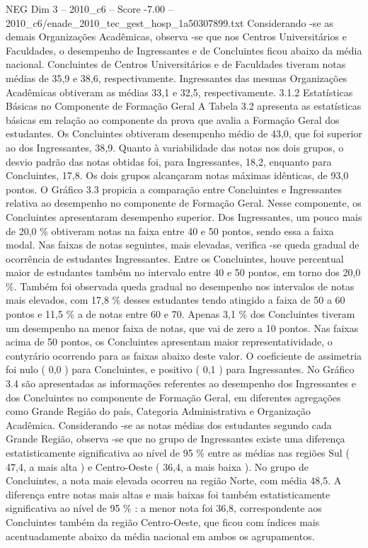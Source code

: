 \begin{textsample}{NEG Dim 3 – 2010\_c6 – Score -7.00 – 2010\_c6/enade\_2010\_tec\_gest\_hosp\_1a50307899.txt}
Considerando -se as demais Organizações Acadêmicas, observa -se que nos Centros Universitários e Faculdades, o desempenho de Ingressantes e de Concluintes ficou abaixo da média nacional.
Concluintes de Centros Universitários e de Faculdades tiveram notas médias de 35,9 e 38,6, respectivamente.
Ingressantes das mesmas Organizações Acadêmicas obtiveram as médias 33,1 e 32,5, respectivamente. 3.1.2 Estatísticas Básicas no Componente de Formação Geral A Tabela 3.2 apresenta as estatísticas básicas em relação ao componente da prova que avalia a Formação Geral dos estudantes.
Os Concluintes obtiveram desempenho médio de 43,0, que foi superior ao dos Ingressantes, 38,9.
Quanto à variabilidade das notas nos dois grupos, o desvio padrão das notas obtidas foi, para Ingressantes, 18,2, enquanto para Concluintes, 17,8.
Os dois grupos alcançaram notas máximas idênticas, de 93,0 pontos.
O Gráfico 3.3 propicia a comparação entre Concluintes e Ingressantes relativa ao desempenho no componente de Formação Geral.
Nesse componente, os Concluintes apresentaram desempenho superior.
Dos Ingressantes, um pouco mais de 20,0 \% obtiveram notas na faixa entre 40 e 50 pontos, sendo essa a faixa modal.
Nas faixas de notas seguintes, mais elevadas, verifica -se queda gradual de ocorrência de estudantes Ingressantes.
Entre os Concluintes, houve percentual maior de estudantes também no intervalo entre 40 e 50 pontos, em torno dos 20,0 \%.
Também foi observada queda gradual no desempenho nos intervalos de notas mais elevados, com 17,8 \% desses estudantes tendo atingido a faixa de 50 a 60 pontos e 11,5 \% a de notas entre 60 e 70.
Apenas 3,1 \% dos Concluintes tiveram um desempenho na menor faixa de notas, que vai de zero a 10 pontos.
Nas faixas acima de 50 pontos, os Concluintes apresentam maior representatividade, o contyrário ocorrendo para as faixas abaixo deste valor.
O coeficiente de assimetria foi nulo ( 0,0 ) para Concluintes, e positivo ( 0,1 ) para Ingressantes.
No Gráfico 3.4 são apresentadas as informações referentes ao desempenho dos Ingressantes e dos Concluintes no componente de Formação Geral, em diferentes agregações como Grande Região do país, Categoria Administrativa e Organização Acadêmica.
Considerando -se as notas médias dos estudantes segundo cada Grande Região, observa -se que no grupo de Ingressantes existe uma diferença estatisticamente significativa ao nível de 95 \% entre as médias nas regiões Sul ( 47,4, a mais alta ) e Centro-Oeste ( 36,4, a mais baixa ).
No grupo de Concluintes, a nota mais elevada ocorreu na região Norte, com média 48,5.
A diferença entre notas mais altas e mais baixas foi também estatisticamente significativa ao nível de 95 \% : a menor nota foi 36,8, correspondente aos Concluintes também da região Centro-Oeste, que ficou com índices mais acentuadamente abaixo da média nacional em ambos os agrupamentos.

\end{textsample}
